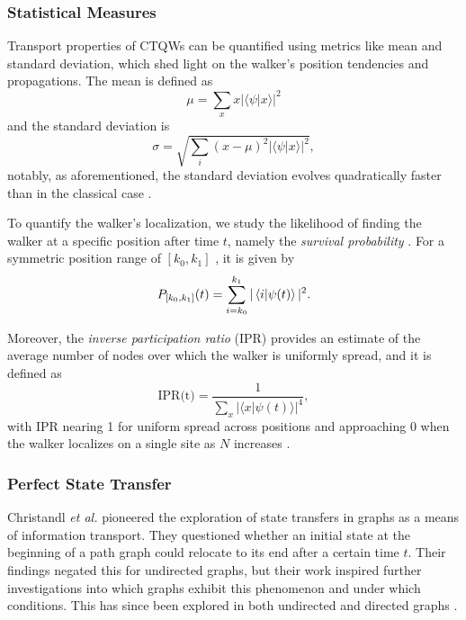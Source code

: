 \documentclass[main.tex]{subfiles}
\begin{document}
\subsubsection{Statistical Measures}

Transport properties of CTQWs can be quantified using metrics like mean and
standard deviation, which shed light on the walker's position tendencies and
propagations. The mean is defined as
\begin{equation}
    \mu = \sum_{x} x |\langle \psi | x \rangle|^2
\end{equation}
and the standard deviation is
\begin{equation}
    \sigma = \sqrt{\sum_{i} (x - \mu)^2 |\langle \psi | x \rangle|^2},
\end{equation}
notably, as aforementioned, the standard deviation evolves quadratically faster
than in the classical case \cite{grimmett2003}.

To quantify the walker's localization, we study the likelihood of finding the
walker at a specific position after time $t$, namely the \textit{survival
probability} \cite{Goenuelol2011}. For a symmetric position range of $ 
[k_0,k_1]$ , it is given by
\begin{equation}
    P_{[k_0,k_1]}(t) = \sum_{i=k_0}^{k_1} |\bra{i}\ket{\psi(t)}|^2.
\end{equation}

Moreover, the \textit{inverse participation ratio} (IPR) provides an estimate
of the average number of nodes over which the walker is uniformly spread, and
it is defined as
\begin{equation}
    \text{IPR(t)} = \frac{1}{\sum_{x} |\langle x | \psi(t) \rangle|^4},
\end{equation} 
with IPR nearing 1 for uniform spread across positions and approaching 0 when
the walker localizes on a single site as $N$ increases \cite{Danaci2021}.

\subsubsection{Perfect State Transfer}

Christandl \textit{et al.} \cite{christandlPerfect04} pioneered the exploration
of state transfers in graphs as a means of information transport. They
questioned whether an initial state at the beginning of a path graph could
relocate to its end after a certain time $t$. Their findings negated this for
undirected graphs, but their work inspired further investigations into which
graphs exhibit this phenomenon and under which conditions. This has since been
explored in both undirected \cite{Coutinho2014, Cheung2014, Zhou2014} and
directed graphs \cite{Lato2020, Cameron2014}.
\end{document}
